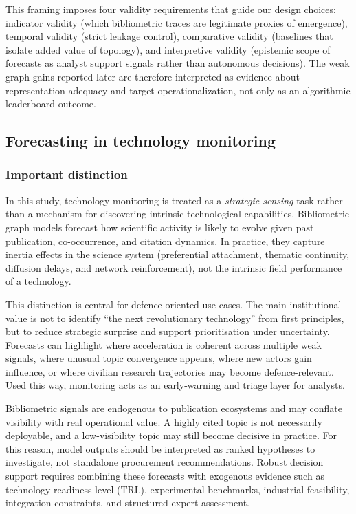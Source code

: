 \documentclass[pdflatex,sn-basic]{sn-jnl}
\begin{document}
This framing imposes four validity requirements that guide our design choices: indicator validity (which bibliometric traces are legitimate proxies of emergence), temporal validity (strict leakage control), comparative validity (baselines that isolate added value of topology), and interpretive validity (epistemic scope of forecasts as analyst support signals rather than autonomous decisions). The weak graph gains reported later are therefore interpreted as evidence about representation adequacy and target operationalization, not only as an algorithmic leaderboard outcome.

\subsection{Forecasting in technology monitoring}

\subsubsection{Important distinction}

In this study, technology monitoring is treated as a \emph{strategic sensing} task rather than a mechanism for discovering intrinsic technological capabilities.
Bibliometric graph models forecast how scientific activity is likely to evolve given past publication, co-occurrence, and citation dynamics.
In practice, they capture inertia effects in the science system (preferential attachment, thematic continuity, diffusion delays, and network reinforcement), not the intrinsic field performance of a technology.

This distinction is central for defence-oriented use cases.
The main institutional value is not to identify ``the next revolutionary technology'' from first principles, but to reduce strategic surprise and support prioritisation under uncertainty.
Forecasts can highlight where acceleration is coherent across multiple weak signals, where unusual topic convergence appears, where new actors gain influence, or where civilian research trajectories may become defence-relevant.
Used this way, monitoring acts as an early-warning and triage layer for analysts.

Bibliometric signals are endogenous to publication ecosystems and may conflate visibility with real operational value.
A highly cited topic is not necessarily deployable, and a low-visibility topic may still become decisive in practice.
For this reason, model outputs should be interpreted as ranked hypotheses to investigate, not standalone procurement recommendations.
Robust decision support requires combining these forecasts with exogenous evidence such as technology readiness level (TRL), experimental benchmarks, industrial feasibility, integration constraints, and structured expert assessment.
\end{document}
